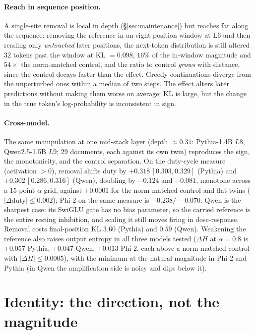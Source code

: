\documentclass[11pt]{article}
\begin{document}
\paragraph{Reach in sequence position.} A single-site removal is local
in depth (\S\ref{sec:maintenance}) but reaches far along the sequence:
removing the reference in an eight-position
window at L6 and then reading only \emph{untouched} later positions, the
next-token distribution is still altered $32$ tokens past the window at
KL $= 0.098$, $16\%$ of the in-window magnitude and $54\times$ the
norm-matched control, and the ratio to control \emph{grows} with
distance, since the control decays faster than the effect. Greedy
continuations diverge from the unperturbed ones within a median of two
steps. The effect alters later predictions without making them worse on
average: KL is large, but the change in the true token's log-probability
is inconsistent in sign.

\paragraph{Cross-model.} The same manipulation at one mid-stack layer (depth
$\approx 0.31$: Pythia-1.4B $L8$, Qwen2.5-1.5B $L9$; 29 documents,
each against its own twin) reproduces the sign, the monotonicity, and
the control separation. On the duty-cycle measure (activation $>0$),
removal shifts duty by $+0.318\,[0.303,0.329]$ (Pythia) and
$+0.302\,[0.286,0.316]$ (Qwen), doubling by $-0.124$ and $-0.081$,
monotone across a 15-point $\alpha$ grid, against $+0.0001$ for the
norm-matched control and flat twins ($|\Delta\text{duty}| \leq
0.002$); Phi-2 on the same measure is $+0.238/-0.070$. Qwen is the
sharpest case: its SwiGLU gate has no bias parameter, so the carried
reference is the entire resting inhibition, and scaling it still moves
firing in dose-response. Removal costs final-position KL $3.60$
(Pythia) and $0.59$ (Qwen). Weakening the reference also raises output
entropy in all three models tested ($\Delta H$ at
$\alpha{=}0.8$ is $+0.057$ Pythia, $+0.047$ Qwen, $+0.013$ Phi-2,
each above a norm-matched control with $|\Delta H| \leq 0.0005$), with the minimum
at the natural magnitude in Phi-2 and Pythia (in Qwen the amplification
side is noisy and dips below it).

\section{Identity: the direction, not the magnitude}
\label{sec:identity}
\end{document}
